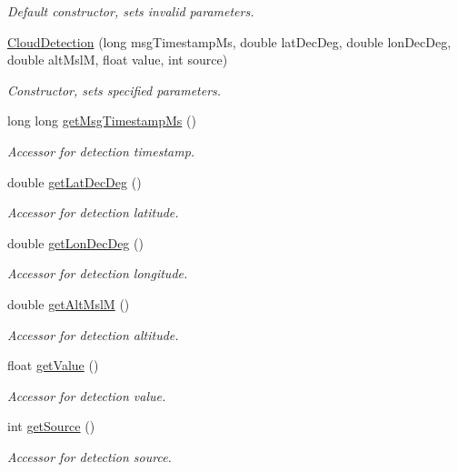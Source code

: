 \begin{DoxyCompactItemize}
\begin{DoxyCompactList}\small\item\em Default constructor, sets invalid parameters. \end{DoxyCompactList}\item 
\hyperlink{class_cloud_detection_a12711360e868bd7dac8eb1ad733653b3}{CloudDetection} (long msgTimestampMs, double latDecDeg, double lonDecDeg, double altMslM, float value, int source)
\begin{DoxyCompactList}\small\item\em Constructor, sets specified parameters. \end{DoxyCompactList}\item 
long long \hyperlink{class_cloud_detection_a7c08546a06dbb224f9937d5c78313b73}{getMsgTimestampMs} ()
\begin{DoxyCompactList}\small\item\em Accessor for detection timestamp. \end{DoxyCompactList}\item 
double \hyperlink{class_cloud_detection_a006ffdad9b3c205b10c342ef8f6ea91e}{getLatDecDeg} ()
\begin{DoxyCompactList}\small\item\em Accessor for detection latitude. \end{DoxyCompactList}\item 
double \hyperlink{class_cloud_detection_abd87d304838c9d764a4ceb0d070fa0c8}{getLonDecDeg} ()
\begin{DoxyCompactList}\small\item\em Accessor for detection longitude. \end{DoxyCompactList}\item 
double \hyperlink{class_cloud_detection_a49dbb860f39a8023094f0f9ac1072689}{getAltMslM} ()
\begin{DoxyCompactList}\small\item\em Accessor for detection altitude. \end{DoxyCompactList}\item 
float \hyperlink{class_cloud_detection_a4e4a5e121f98f857263c998171ac92bc}{getValue} ()
\begin{DoxyCompactList}\small\item\em Accessor for detection value. \end{DoxyCompactList}\item 
int \hyperlink{class_cloud_detection_abae618ee83e7b59df7bb09bcd49fc691}{getSource} ()
\begin{DoxyCompactList}\small\item\em Accessor for detection source. \end{DoxyCompactList}\item 

\end{DoxyCompactItemize}
